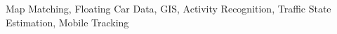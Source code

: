 \documentclass[conference,spanish]{IEEEtran}
\begin{document}
	\begin{IEEEkeywords}
		Map Matching, Floating Car Data, GIS, Activity Recognition, Traffic State Estimation, Mobile Tracking
	\end{IEEEkeywords}

	\IEEEpeerreviewmaketitle
	
	
	
	
	
	
	
	
	
	
\end{document}
